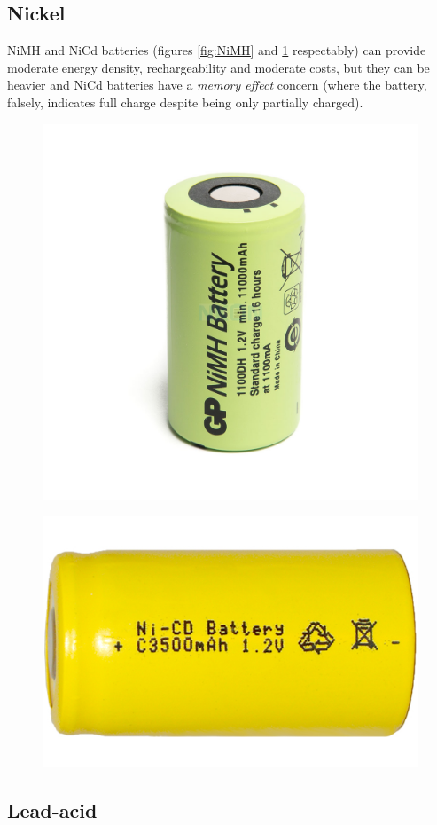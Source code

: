 \subsection{Nickel}
\gls{NiMH} and \gls{NiCd} batteries (figures \ref{fig:NiMH} and \ref{fig:NiCd} respectably) can provide moderate energy density, rechargeability and moderate costs, but they can be heavier and \gls{NiCd} batteries have a \textit{memory effect} concern (where the battery, falsely, indicates full charge despite being only partially charged).
\begin{figure}[H]
    \centering
    \begin{minipage}{.5\textwidth}
        \centering
        \includegraphics[width=.5\linewidth]{ch3/assets/nimh.jpg}
        \label{fig:NiMH}
    \end{minipage}%
    \begin{minipage}{.5\textwidth}
        \centering
        \includegraphics[width=.5\linewidth]{ch3/assets/nicd.jpg}
        \label{fig:NiCd}
    \end{minipage}
\end{figure}

\subsection{Lead-acid}

